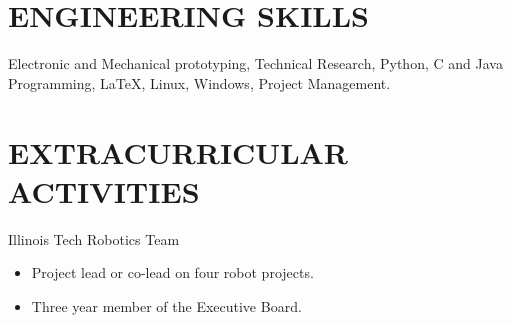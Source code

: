 \documentclass{res}
\begin{document}
\begin{resume}


\section{ENGINEERING SKILLS}          
Electronic and Mechanical prototyping, Technical Research, Python, C and Java Programming, \LaTeX{}, Linux, Windows, Project Management.
 
 
 
\section{EXTRACURRICULAR ACTIVITIES}          
    Illinois Tech Robotics Team
    \begin{itemize}
       \item Project lead or co-lead on four robot projects.
       \item Three year member of the Executive Board.
    \end{itemize}
\end{resume}
\end{document}
